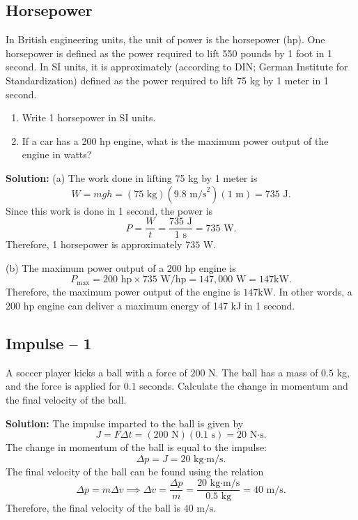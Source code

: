 \documentclass[12pt]{article}
\begin{document}
\subsection{Horsepower}

In British engineering units, the unit of power is the horsepower (hp). One horsepower is defined as the power required to lift 550 pounds by 1 foot in 1 second. In SI units, it is approximately (according to DIN; German Institute for Standardization) defined as the power required to lift 75 kg by 1 meter in 1 second. 

\begin{enumerate}
    \item[(a)] Write 1 horsepower in SI units.
    \item[(b)] If a car has a 200 hp engine, what is the maximum power output of the engine in watts?
\end{enumerate}

\textbf{Solution:}
(a) The work done in lifting 75 kg by 1 meter is
\begin{equation}
W = mgh = (75 \text{ kg})(9.8 \text{ m/s}^2)(1 \text{ m}) = 735 \text{ J}. 
\end{equation}
Since this work is done in 1 second, the power is
\begin{equation}
P = \frac{W}{t} = \frac{735 \text{ J}}{1 \text{ s}} = 735 \text{ W}.
\end{equation}
Therefore, 1 horsepower is approximately $\boxed{735 \text{ W}}$.

(b) The maximum power output of a 200 hp engine is
\begin{equation}
P_{\text{max}} = 200 \text{ hp} \times 735 \text{ W/hp} = 147,000 \text{ W} = 147 \text{kW}.
\end{equation}
Therefore, the maximum power output of the engine is $\boxed{147 \text{kW}}$. In other words, a 200 hp engine can deliver a maximum energy of 147 kJ in 1 second.



\subsection{Impulse -- 1}
A soccer player kicks a ball with a force of $200$ N. The ball has a mass of $0.5$
kg, and the force is applied for $0.1$ seconds. Calculate the change in momentum and the final velocity of the ball.

\textbf{Solution:} The impulse imparted to the ball is given by
\begin{equation}
J = F \Delta t = (200 \text{ N})(0.1 \text{ s}) = 20 \text{ N·s}.
\end{equation}
The change in momentum of the ball is equal to the impulse:
\begin{equation}\Delta p = J = 20 \text{ kg·m/s}.
\end{equation}
The final velocity of the ball can be found using the relation
\begin{equation}\Delta p = m \Delta v \implies \Delta v = \frac{\Delta p}{m} = \frac{20 \text{ kg·m/s}}{0.5 \text{ kg}} = 40 \text{ m/s}.
\end{equation}
Therefore, the final velocity of the ball is $\boxed{40 \text{ m/s}}$.
\end{document}

